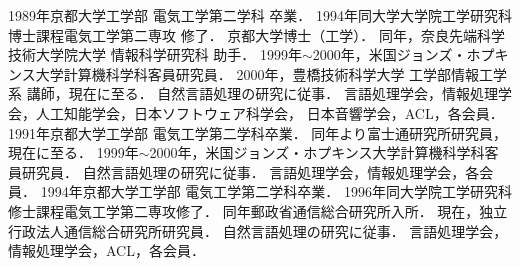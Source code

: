 \clearpage

\begin{biography}
{1989年京都大学工学部 電気工学第二学科 卒業．
1994年同大学大学院工学研究科 博士課程電気工学第二専攻 修了．
京都大学博士（工学）．
同年，奈良先端科学技術大学院大学 情報科学研究科 助手．
1999年$\sim$2000年，米国ジョンズ・ホプキンス大学計算機科学科客員研究員．
2000年，豊橋技術科学大学 工学部情報工学系 講師，現在に至る．
自然言語処理の研究に従事．
言語処理学会，情報処理学会，人工知能学会，日本ソフトウェア科学会，
日本音響学会，ACL，各会員．
}
{1991年京都大学工学部 電気工学第二学科卒業．
同年より富士通研究所研究員，現在に至る．
1999年$\sim$2000年，米国ジョンズ・ホプキンス大学計算機科学科客員研究員．
自然言語処理の研究に従事．
言語処理学会，情報処理学会，各会員．
}
{1994年京都大学工学部 電気工学第二学科卒業．
1996年同大学院工学研究科 修士課程電気工学第二専攻修了．
同年郵政省通信総合研究所入所．
現在，独立行政法人通信総合研究所研究員．
自然言語処理の研究に従事．
言語処理学会，情報処理学会，ACL，各会員．
}

\end{biography}



